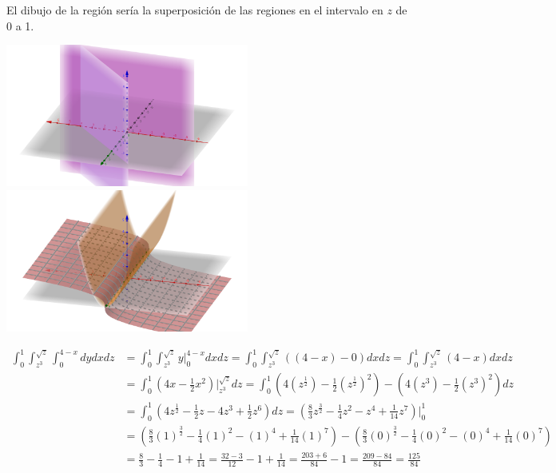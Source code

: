 \documentclass{article}
\begin{document}
\begin{enumerate}
{        \color{azul}
        El dibujo de la región sería la superposición de las regiones en el
        intervalo en $z$ de 0 a 1.
        \begin{center}
        \includegraphics[width=8cm]{img/ej2_1.png}
            \includegraphics[width=8cm]{img/ej2_2.png}
        \end{center}
        \begin{align*}
            \int_{0}^{1} \int_{z^3}^{\sqrt{z}} \int_{0}^{4-x} dydxdz
                &= \int_{0}^{1} \int_{z^3}^{\sqrt{z}} y \Big|_{0}^{4-x} dxdz
                    = \int_{0}^{1} \int_{z^3}^{\sqrt{z}} ((4-x)-0) dxdz
                    = \int_{0}^{1} \int_{z^3}^{\sqrt{z}} (4-x) dxdz\\
                &= \int_{0}^{1} (4x - \frac{1}{2}x^2) \Big |_{z^3}^{\sqrt{z}} dz
                    = \int_{0}^{1} (4(z^{\frac{1}{2}}) - \frac{1}{2}(z^{\frac{1}{2}})^2) - (4(z^3)
                    - \frac{1}{2}(z^3)^2) dz\\
                &= \int_{0}^{1} (4z^{\frac{1}{2}} - \frac{1}{2}z - 4z^3 + \frac{1}{2}z^6) dz
                    = (\frac{8}{3}z^{\frac{3}{2}} - \frac{1}{4}z^2 - z^4 + \frac{1}{14}z^7) \Big |_{0}^{1}\\
                &= (\frac{8}{3}(1)^{\frac{3}{2}} - \frac{1}{4}(1)^2 - (1)^4 + \frac{1}{14}(1)^7)
                    - (\frac{8}{3}(0)^{\frac{3}{2}} - \frac{1}{4}(0)^2 - (0)^4 + \frac{1}{14}(0)^7)\\
                &= \frac{8}{3} - \frac{1}{4} - 1 + \frac{1}{14} = \frac{32-3}{12} - 1 + \frac{1}{14}
                    = \frac{203+6}{84} - 1 = \frac{209 - 84}{84} = \frac{125}{84}
        \end{align*}
    }


\end{enumerate}
\end{document}
